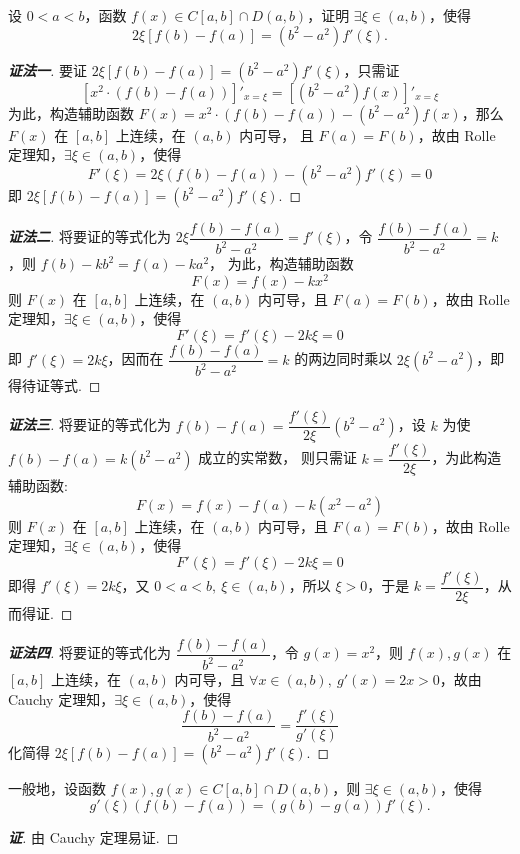 \begin{example}
    设 $0<a<b$，函数 $f(x)\in C[a,b]\cap D(a,b)$，证明 $\exists\xi\in(a,b)$，使得
    $$2\xi[f(b)-f(a)]=(b^2-a^2)f'(\xi).$$
\end{example}
\begin{proof}[{\songti \textbf{证法一}}]
    要证 $2\xi[f(b)-f(a)]=(b^2-a^2)f'(\xi)$，只需证
    $$\left[x^2\cdot(f(b)-f(a))\right]'_{x=\xi}=\left[(b^2-a^2)f(x)\right]'_{x=\xi}$$
    为此，构造辅助函数 $F(x)=x^2\cdot(f(b)-f(a))-(b^2-a^2)f(x)$，那么 $F(x)$ 在 $[a,b]$ 上连续，在 $(a,b)$ 内可导，
    且 $F(a)=F(b)$，故由 Rolle 定理知，$\exists\xi\in(a,b)\text{，使得 }$
    $$F'(\xi)=2\xi(f(b)-f(a))-(b^2-a^2)f'(\xi)=0$$
    即 $2\xi[f(b)-f(a)]=(b^2-a^2)f'(\xi).$
\end{proof}
\begin{proof}[{\songti \textbf{证法二}}]
    将要证的等式化为 $2\xi\dfrac{f(b)-f(a)}{b^2-a^2}=f'(\xi)$，令 $\dfrac{f(b)-f(a)}{b^2-a^2}=k$，则 $f(b)-kb^2=f(a)-ka^2$，
    为此，构造辅助函数 $$F(x)=f(x)-kx^2$$
    则 $F(x)$ 在 $[a,b]$ 上连续，在 $(a,b)$ 内可导，且 $F(a)=F(b)$，故由 Rolle 定理知，$\exists\xi\in(a,b)\text{，使得 }$
    $$F'(\xi)=f'(\xi)-2k\xi =0$$
    即 $f'(\xi)=2k\xi$，因而在 $\dfrac{f(b)-f(a)}{b^2-a^2}=k$ 的两边同时乘以 $2\xi (b^2-a^2)$，即得待证等式.
\end{proof}
\begin{proof}[{\songti \textbf{证法三}}]
    将要证的等式化为 $f(b)-f(a)=\dfrac{f'(\xi)}{2\xi}(b^2-a^2)$，设 $k$ 为使 $f(b)-f(a)=k(b^2-a^2)$ 成立的实常数，
    则只需证 $k=\dfrac{f'(\xi)}{2\xi}$，为此构造辅助函数:
    $$F(x)=f(x)-f(a)-k(x^2-a^2)$$
    则 $F(x)$ 在 $[a,b]$ 上连续，在 $(a,b)$ 内可导，且 $F(a)=F(b)$，故由 Rolle 定理知，$\exists\xi\in(a,b)\text{，使得 }$
    $$F'(\xi)=f'(\xi)-2k\xi=0$$
    即得 $f'(\xi)=2k\xi$，又 $0<a<b,~\xi\in(a,b)$，所以 $\xi>0$，于是 $k=\dfrac{f'(\xi)}{2\xi}$，从而得证.
\end{proof}
\begin{proof}[{\songti \textbf{证法四}}]
    将要证的等式化为 $\dfrac{f(b)-f(a)}{b^2-a^2}$，令 $g(x)=x^2$，则 $f(x),g(x)$ 在 $[a,b]$ 上连续，在 $(a,b)$ 内可导，且
    $\forall x\in(a,b),~g'(x)=2x>0$，故由 Cauchy 定理知，$\exists\xi\in(a,b)\text{，使得 }$
    $$\dfrac{f(b)-f(a)}{b^2-a^2}=\dfrac{f'(\xi)}{g'(\xi)}$$
    化简得 $2\xi[f(b)-f(a)]=(b^2-a^2)f'(\xi).$
\end{proof}
\begin{inference}
    一般地，设函数 $f(x),g(x)\in C[a,b]\cap D(a,b)$，则 $\exists\xi\in(a,b)\text{，使得 }$
    $$g'(\xi)(f(b)-f(a))=(g(b)-g(a))f'(\xi).$$
\end{inference}
\begin{proof}[{\songti \textbf{证}}]
    由 Cauchy 定理易证.
\end{proof}

